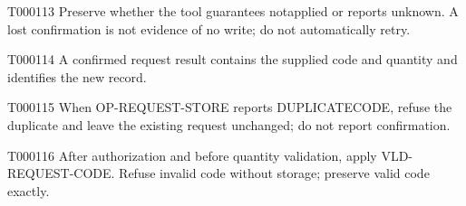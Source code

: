 \documentclass[11pt,a4paper]{article}
\begin{document}
\begin{atlasparagraph}{T000113}
Preserve whether the tool guarantees not\AtlasCharUnderscore{}applied or reports unknown. A lost confirmation is not evidence of no write; do not automatically retry.
\end{atlasparagraph}
\begin{atlasparagraph}{T000114}
A confirmed request result contains the supplied code and quantity and identifies the new record.
\end{atlasparagraph}
\begin{atlasparagraph}{T000115}
When OP-REQUEST-STORE reports DUPLICATE\AtlasCharUnderscore{}CODE, refuse the duplicate and leave the existing request unchanged; do not report confirmation.
\end{atlasparagraph}
\begin{atlasparagraph}{T000116}
After authorization and before quantity validation, apply VLD-REQUEST-CODE. Refuse invalid code without storage; preserve valid code exactly.
\end{atlasparagraph}
\end{document}
